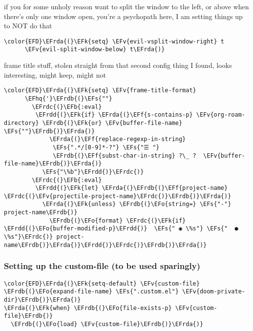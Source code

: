 \documentclass{article}
\newcommand{\EFs}[1]{\textcolor{EFs}{#1}} %
\newcommand{\EFk}[1]{\textcolor{EFk}{#1}} %
\newcommand{\EFb}[1]{\textcolor{EFb}{#1}} %
\newcommand{\EFf}[1]{\textcolor{EFf}{#1}} %
\newcommand{\EFv}[1]{\textcolor{EFv}{#1}} %
\newcommand{\EFo}[1]{\textcolor{EFo}{#1}} %
\newcommand{\EFhq}[1]{#1} %
\newcommand{\EFrda}[1]{\textcolor{EFrda}{#1}} %
\newcommand{\EFrdb}[1]{\textcolor{EFrdb}{#1}} %
\newcommand{\EFrdc}[1]{\textcolor{EFrdc}{#1}} %
\newcommand{\EFrdd}[1]{\textcolor{EFrdd}{#1}} %
\begin{document}
if you for some unholy reason want to split the window to the left, or above when there's only one window open,
you're a psychopath here, I am setting things up to NOT do that
\begin{Code}
\begin{Verbatim}
\color{EFD}\EFrda{(}\EFk{setq} \EFv{evil-vsplit-window-right} t
      \EFv{evil-split-window-below} t\EFrda{)}
\end{Verbatim}
\end{Code}

frame title stuff, stolen straight from that second config thing I found, looks interesting, might keep, might not

\begin{Code}
\begin{Verbatim}
\color{EFD}\EFrda{(}\EFk{setq} \EFv{frame-title-format}
      \EFhq{'}\EFrdb{(}\EFs{""}
        \EFrdc{(}\EFb{:eval}
         \EFrdd{(}\EFk{if} \EFrda{(}\EFf{s-contains-p} \EFv{org-roam-directory} \EFrdb{(}\EFk{or} \EFv{buffer-file-name} \EFs{""}\EFrdb{)}\EFrda{)}
             \EFrda{(}\EFf{replace-regexp-in-string}
              \EFs{".*/[0-9]*-?"} \EFs{"☰ "}
              \EFrdb{(}\EFf{subst-char-in-string} ?\_ ?  \EFv{buffer-file-name}\EFrdb{)}\EFrda{)}
           \EFs{"\%b"}\EFrdd{)}\EFrdc{)}
        \EFrdc{(}\EFb{:eval}
         \EFrdd{(}\EFk{let} \EFrda{(}\EFrdb{(}\EFf{project-name} \EFrdc{(}\EFv{projectile-project-name}\EFrdc{)}\EFrdb{)}\EFrda{)}
           \EFrda{(}\EFk{unless} \EFrdb{(}\EFo{string=} \EFs{"-"} project-name\EFrdb{)}
             \EFrdb{(}\EFo{format} \EFrdc{(}\EFk{if} \EFrdd{(}\EFo{buffer-modified-p}\EFrdd{)}  \EFs{" ◉ \%s"} \EFs{"  ●  \%s"}\EFrdc{)} project-name\EFrdb{)}\EFrda{)}\EFrdd{)}\EFrdc{)}\EFrdb{)}\EFrda{)}
\end{Verbatim}
\end{Code}


\subsubsection{Setting up the custom-file (to be used sparingly)}
\label{sec:orga674ac5}
\begin{Code}
\begin{Verbatim}
\color{EFD}\EFrda{(}\EFk{setq-default} \EFv{custom-file} \EFrdb{(}\EFo{expand-file-name} \EFs{".custom.el"} \EFv{doom-private-dir}\EFrdb{)}\EFrda{)}
\EFrda{(}\EFk{when} \EFrdb{(}\EFo{file-exists-p} \EFv{custom-file}\EFrdb{)}
  \EFrdb{(}\EFo{load} \EFv{custom-file}\EFrdb{)}\EFrda{)}
\end{Verbatim}
\end{Code}
\end{document}
